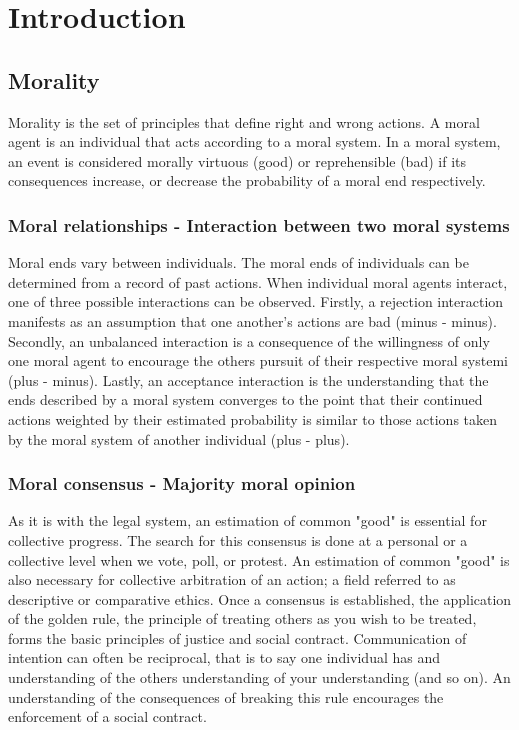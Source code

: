 \chapter{Introduction}
\section{Morality}
Morality is the set of principles that define right and wrong actions.
A moral agent is an individual that acts according to a moral system.
In a moral system, an event is considered morally virtuous (good) or reprehensible (bad) if its consequences increase, or decrease the probability of a moral end respectively.

\subsection{Moral relationships - Interaction between two moral systems}
Moral ends vary between individuals.
The moral ends of individuals can be determined from a record of past actions.
When individual moral agents interact, one of three possible interactions can be observed.
Firstly, a rejection interaction manifests as an assumption that one another's actions are bad (minus - minus). 
Secondly, an unbalanced interaction is a consequence of the willingness of only one moral agent to encourage the others pursuit of their respective moral systemi (plus - minus).
Lastly, an acceptance interaction is the understanding that the ends described by a moral system converges to the point that their continued actions weighted by their estimated probability is similar to those actions taken by the moral system of another individual (plus - plus).

\subsection{Moral consensus - Majority moral opinion}
As it is with the legal system, an estimation of common "good" is essential for collective progress.
The search for this consensus is done at a personal or a collective level when we vote, poll, or protest. 
An estimation of common "good" is also necessary for collective arbitration of an action; a field referred to as descriptive or comparative ethics.
Once a consensus is established, the application of the golden rule, the principle of treating others as you wish to be treated, forms the basic principles of justice and social contract.
Communication of intention can often be reciprocal, that is to say one individual has and understanding of the others understanding of your understanding (and so on).
An understanding of the consequences of breaking this rule encourages the enforcement of a social contract.


